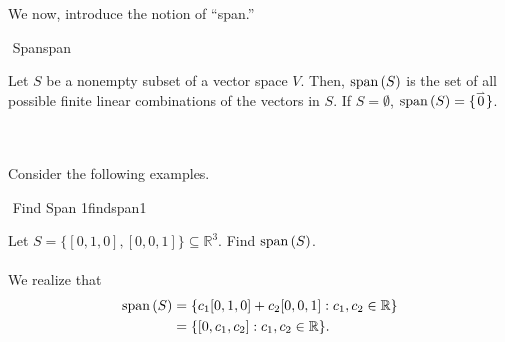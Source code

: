         \vphantom
        \\
        \\
        We now, introduce the notion of ``span.''
        \begin{definition}{\Stop\,\,Span}{span}

            Let \(S\) be a nonempty subset of a vector space \(V\). Then, \(\text{span\,}(S)\) is the set of all possible finite linear combinations of the vectors in \(S\). If \(S=\emptyset\), \(\text{span\,}(S)=\{\overset{_{\rightharpoonup}}{0}\}\). 
            
        \end{definition}
        \pagebreak
        \vphantom
        \\
        \\
        Consider the following examples.
        \begin{example}{\Difficulty\,\,Find Span 1}{findspan1}
            
            Let \(S=\{[0,1,0],[0,0,1]\}\subseteq \mathbb{R}^3\). Find \(\text{span\,}(S)\).
            \\
            \\
            We realize that
            \begin{align*}
                \text{span\,}(S)&=\{c_1[0,1,0]+c_2[0,0,1]:c_1,c_2\in\mathbb{R}\} \\
                &=\{[0,c_1,c_2]:c_1,c_2\in\mathbb{R}\}.
            \end{align*}

        \end{example}
